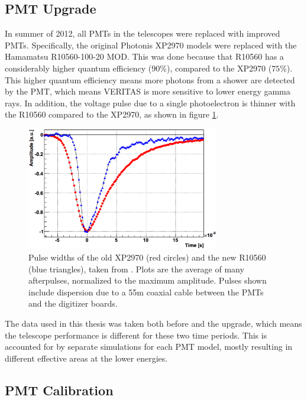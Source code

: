 \subsection{PMT Upgrade}
In summer of 2012, all PMTs in the telescopes were replaced with improved PMTs.
Specifically, the original Photonis XP2970 models were replaced with the Hamamatsu R10560-100-20 MOD.
This was done because that R10560 has a considerably higher quantum efficiency (\nicetilde$90\%$), compared to the XP2970 (\nicetilde$75\%$).
This higher quantum efficiency means more photons from a shower are detected by the PMT, which means VERITAS is more sensitive to lower energy gamma rays\cite{pmtmodels}.
In addition, the voltage pulse due to a single photoelectron is thinner with the R10560 compared to the XP2970, as shown in figure \ref{fig:pmt_pulse_widths}.

\begin{figure}[h]
  \begin{center}
    \includegraphics[width=0.75\textwidth]{images/pmt_models_pulsewidths.eps}
    \caption[Pulse Widths]{Pulse widths of the old XP2970 (red circles) and the new R10560 (blue triangles), taken from \cite{pmtmodels}.  Plots are the average of many afterpulses, normalized to the maximum amplitude.  Pulses shown include dispersion due to a \nicetilde55m coaxial cable between the PMTs and the digitizer boards.}\label{fig:pmt_pulse_widths}
  \end{center}
\end{figure}

The data used in this thesis was taken both before and the upgrade, which means the telescope performance is different for these two time periods.
This is accounted for by separate simulations for each PMT model, mostly resulting in different effective areas at the lower energies.


\subsection{PMT Calibration}


